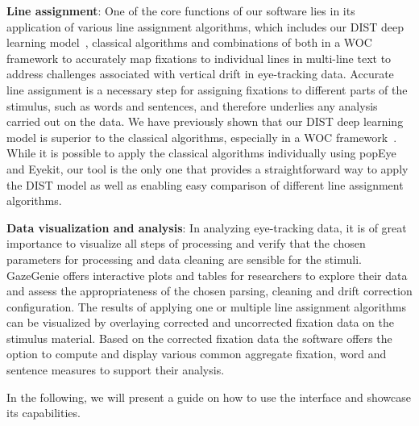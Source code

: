\documentclass[twocolumn]{article}
\begin{document}
\textbf{Line assignment}: One of the core functions of our software lies in its application of various line assignment algorithms, which includes our DIST deep learning model~\cite{mercierDualInputStream2024a}, classical algorithms\cite{carrAlgorithmsAutomatedCorrection2022} and combinations of both in a WOC framework to accurately map fixations to individual lines in multi-line text to address challenges associated with vertical drift in eye-tracking data. Accurate line assignment is a necessary step for assigning fixations to different parts of the stimulus, such as words and sentences, and therefore underlies any analysis carried out on the data. We have previously shown that our DIST deep learning model is superior to the classical algorithms, especially in a WOC framework~\cite{mercierDualInputStream2024a}. While it is possible to apply the classical algorithms individually using popEye and Eyekit, our tool is the only one that provides a straightforward way to apply the DIST model as well as enabling easy comparison of different line assignment algorithms.


\textbf{Data visualization and analysis}: In analyzing eye-tracking data, it is of great importance to visualize all steps of processing and verify that the chosen parameters for processing and data cleaning are sensible for the stimuli. GazeGenie offers interactive plots and tables for researchers to explore their data and assess the appropriateness of the chosen parsing, cleaning and drift correction configuration. The results of applying one or multiple line assignment algorithms can be visualized by overlaying corrected and uncorrected fixation data on the stimulus material. Based on the corrected fixation data the software offers the option to compute and display various common aggregate fixation, word and sentence measures to support their analysis.

In the following, we will present a guide on how to use the interface and showcase its capabilities.
\end{document}
